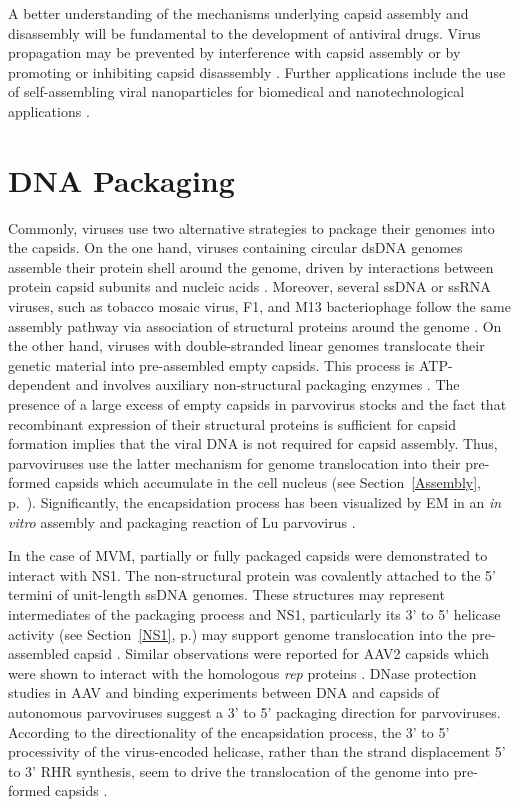 A better understanding of the mechanisms underlying capsid assembly and disassembly will be fundamental to the development of antiviral drugs. Virus propagation may be prevented by interference with capsid assembly or by promoting or inhibiting capsid disassembly \cite{pmid21762804, pmid21163649}. Further applications include the use of self-assembling viral nanoparticles for biomedical and nanotechnological applications \cite{pmid16521330, pmid16690856}.     


  
\section{DNA Packaging}
\label{Packaging}

Commonly, viruses use two alternative strategies to package their genomes into the capsids. On the one hand, viruses containing circular dsDNA genomes assemble their protein shell around the genome, driven by interactions between protein capsid subunits and nucleic acids \cite{pmid6101085, pmid6305987, pmid1323699}. Moreover, several ssDNA or ssRNA viruses, such as tobacco mosaic virus, F1, and M13 bacteriophage follow the same assembly pathway via association of structural proteins around the genome \cite{pmid11406604}. On the other hand, viruses with double-stranded linear genomes translocate their genetic material into pre-assembled empty capsids. This process is ATP-dependent and involves auxiliary non-structural packaging enzymes \cite{pmid2679356}. The presence of a large excess of empty capsids in parvovirus stocks and the fact that recombinant expression of their structural proteins is sufficient for capsid formation \cite{pmid1331503} implies that the viral DNA is not required for capsid assembly. Thus, parvoviruses use the latter mechanism for genome translocation into their pre-formed capsids which accumulate in the cell nucleus (see Section~\ref{Assembly}, p.~\pageref{Assembly}). Significantly, the encapsidation process has been visualized by EM in an \textit{in vitro} assembly and packaging reaction of Lu parvovirus \cite{pmid6221078}.

In the case of MVM, partially or fully packaged capsids were demonstrated to interact with NS1. The non-structural protein was covalently attached to the 5' termini of unit-length ssDNA genomes. These structures may represent intermediates of the packaging process and NS1, particularly its 3' to 5' helicase activity (see Section~\ref{NS1}, p.\pageref{NS1}) may support genome translocation into the pre-assembled capsid \cite{pmid2527311}. Similar observations were reported for AAV2 capsids which were shown to interact with the homologous \textit{rep} proteins \cite{pmid8553536, pmid8995658}. DNase protection studies in AAV \cite{pmid11406604} and binding experiments between DNA and capsids of autonomous parvoviruses \cite{pmid2145445, pmid8350419} suggest a 3’ to 5’ packaging direction for parvoviruses. According to the directionality of the encapsidation process, the 3’ to 5’ processivity of the virus-encoded helicase, rather than the strand displacement 5' to 3' RHR synthesis, seem to drive the translocation of the genome into pre-formed capsids \cite{pmid11406604}. 

